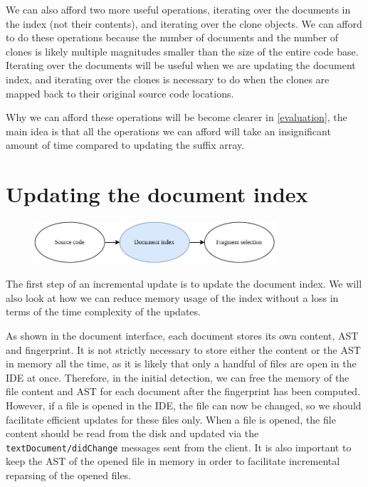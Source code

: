 We can also afford two more useful operations, iterating over the documents in the index
(not their contents), and iterating over the clone objects. We can afford to do these
operations because the number of documents and the number of clones is likely multiple
magnitudes smaller than the size of the entire code base. Iterating over the documents
will be useful when we are updating the document index, and iterating over the clones is
necessary to do when the clones are mapped back to their original source code locations.

Why we can afford these operations will be become clearer in \cref{evaluation}, the main
idea is that all the operations we can afford will take an insignificant amount of time
compared to updating the suffix array.

\section{Updating the document index}

\begin{figure}[H]
    \begin{center}
        \includegraphics[width=0.8\textwidth]{figures/phases/phases_documentindex.drawio.pdf}
    \end{center}
\end{figure}

The first step of an incremental update is to update the document index. We will also look
at how we can reduce memory usage of the index without a loss in terms of the time
complexity of the updates.

As shown in the document interface, each document stores its own content, AST and
fingerprint. It is not strictly necessary to store either the content or the AST in memory
all the time, as it is likely that only a handful of files are open in the IDE at once.
Therefore, in the initial detection, we can free the memory of the file content and AST
for each document after the fingerprint has been computed. However, if a file is opened in
the IDE, the file can now be changed, so we should facilitate efficient updates for these
files only. When a file is opened, the file content should be read from the disk and
updated via the \verb|textDocument/didChange| messages sent from the client. It is also
important to keep the AST of the opened file in memory in order to facilitate incremental
reparsing of the opened files. 

